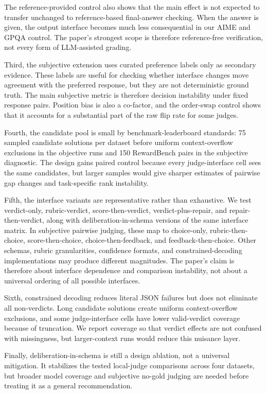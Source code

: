 \documentclass[journal]{IEEEtran}
\begin{document}
The reference-provided control also shows that the main effect is not expected to transfer unchanged to reference-based final-answer checking. When the answer is given, the output interface becomes much less consequential in our AIME and GPQA control. The paper's strongest scope is therefore reference-free verification, not every form of LLM-assisted grading.

Third, the subjective extension uses curated preference labels only as secondary evidence. These labels are useful for checking whether interface changes move agreement with the preferred response, but they are not deterministic ground truth. The main subjective metric is therefore decision instability under fixed response pairs. Position bias is also a co-factor, and the order-swap control shows that it accounts for a substantial part of the raw flip rate for some judges.

Fourth, the candidate pool is small by benchmark-leaderboard standards: 75 sampled candidate solutions per dataset before uniform context-overflow exclusions in the objective runs and 150 RewardBench pairs in the subjective diagnostic. The design gains paired control because every judge-interface cell sees the same candidates, but larger samples would give sharper estimates of pairwise gap changes and task-specific rank instability.

Fifth, the interface variants are representative rather than exhaustive. We test verdict-only, rubric-verdict, score-then-verdict, verdict-plus-repair, and repair-then-verdict, along with deliberation-in-schema versions of the same interface matrix. In subjective pairwise judging, these map to choice-only, rubric-then-choice, score-then-choice, choice-then-feedback, and feedback-then-choice. Other schemas, rubric granularities, confidence formats, and constrained-decoding implementations may produce different magnitudes. The paper's claim is therefore about interface dependence and comparison instability, not about a universal ordering of all possible interfaces.

Sixth, constrained decoding reduces literal JSON failures but does not eliminate all non-verdicts. Long candidate solutions create uniform context-overflow exclusions, and some judge-interface cells have lower valid-verdict coverage because of truncation. We report coverage so that verdict effects are not confused with missingness, but larger-context runs would reduce this nuisance layer.

Finally, deliberation-in-schema is still a design ablation, not a universal mitigation. It stabilizes the tested local-judge comparisons across four datasets, but broader model coverage and subjective no-gold judging are needed before treating it as a general recommendation.
\end{document}
